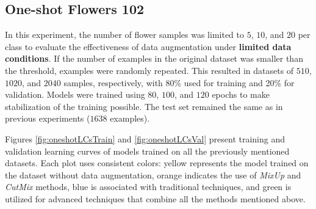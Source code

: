 \subsection{One-shot Flowers 102}
\label{ssec:resultsOneshotFlowers}

In this experiment, the number of flower samples was limited to $5$, $10$, and $20$ per class to evaluate the effectiveness of data augmentation under \textbf{limited data conditions}. If the number of examples in the original dataset was smaller than the threshold, examples were randomly repeated. This resulted in datasets of $510$, $1020$, and $2040$ samples, respectively, with 80\% used for training and 20\% for validation. Models were trained using $80$, $100$, and $120$ epochs to make stabilization of the training possible. The test set remained the same as in previous experiments ($1638$ examples).

Figures \ref{fig:oneshotLCsTrain} and \ref{fig:oneshotLCsVal} present training and validation learning curves of models trained on all the previously mentioned datasets. Each plot uses consistent colors: yellow represents the model trained on the dataset without data augmentation, orange indicates the use of \textit{MixUp} and \textit{CutMix} methods, blue is associated with traditional techniques, and green is utilized for advanced techniques that combine all the methods mentioned above.

